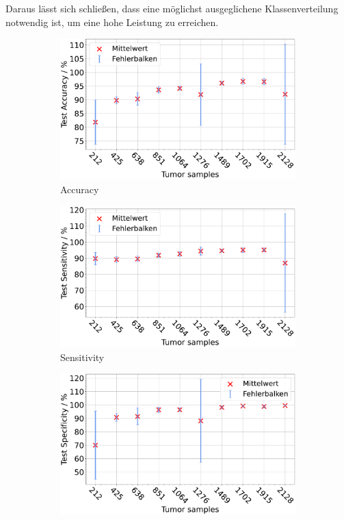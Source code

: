 Daraus lässt sich schließen, dass eine möglichst ausgeglichene Klassenverteilung notwendig ist, um eine hohe Leistung zu erreichen.
\begin{figure}[H]
  \centering
  \begin{subfigure}[b]{0.48\textwidth}
    \includegraphics[width=\textwidth]{plots/neu Reduzierung-Tu + Balance_Accuracy_mean.pdf}
    \caption{Accuracy}
    \label{fig:reduzierung_tu_accuracy}
  \end{subfigure}
  \begin{subfigure}[b]{0.48\textwidth}
    \includegraphics[width=\textwidth]{plots/neu Reduzierung-Tu + Balance_Sensitivity_mean.pdf}
    \caption{Sensitivity}
    \label{fig:reduzierung_tu_sensitivity}
  \end{subfigure}
  \begin{subfigure}[b]{0.48\textwidth}
    \includegraphics[width=\textwidth]{plots/neu Reduzierung-Tu + Balance_Specificity_mean.pdf}

\end{subfigure}
\end{figure}
